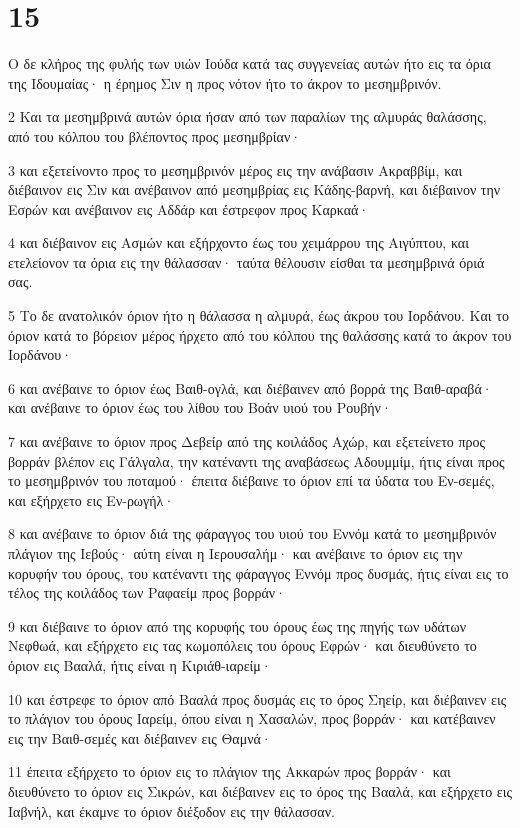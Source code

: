 \chapter{15}

\par Ο δε κλήρος της φυλής των υιών Ιούδα κατά τας συγγενείας αυτών ήτο εις τα όρια της Ιδουμαίας· η έρημος Σιν η προς νότον ήτο το άκρον το μεσημβρινόν.
\par 2 Και τα μεσημβρινά αυτών όρια ήσαν από των παραλίων της αλμυράς θαλάσσης, από του κόλπου του βλέποντος προς μεσημβρίαν·
\par 3 και εξετείνοντο προς το μεσημβρινόν μέρος εις την ανάβασιν Ακραββίμ, και διέβαινον εις Σιν και ανέβαινον από μεσημβρίας εις Κάδης-βαρνή, και διέβαινον την Εσρών και ανέβαινον εις Αδδάρ και έστρεφον προς Καρκαά·
\par 4 και διέβαινον εις Ασμών και εξήρχοντο έως του χειμάρρου της Αιγύπτου, και ετελείονον τα όρια εις την θάλασσαν· ταύτα θέλουσιν είσθαι τα μεσημβρινά όριά σας.
\par 5 Το δε ανατολικόν όριον ήτο η θάλασσα η αλμυρά, έως άκρου του Ιορδάνου. Και το όριον κατά το βόρειον μέρος ήρχετο από του κόλπου της θαλάσσης κατά το άκρον του Ιορδάνου·
\par 6 και ανέβαινε το όριον έως Βαιθ-ογλά, και διέβαινεν από βορρά της Βαιθ-αραβά· και ανέβαινε το όριον έως του λίθου του Βοάν υιού του Ρουβήν·
\par 7 και ανέβαινε το όριον προς Δεβείρ από της κοιλάδος Αχώρ, και εξετείνετο προς βορράν βλέπον εις Γάλγαλα, την κατέναντι της αναβάσεως Αδουμμίμ, ήτις είναι προς το μεσημβρινόν του ποταμού· έπειτα διέβαινε το όριον επί τα ύδατα του Εν-σεμές, και εξήρχετο εις Εν-ρωγήλ·
\par 8 και ανέβαινε το όριον διά της φάραγγος του υιού του Εννόμ κατά το μεσημβρινόν πλάγιον της Ιεβούς· αύτη είναι η Ιερουσαλήμ· και ανέβαινε το όριον εις την κορυφήν του όρους, του κατέναντι της φάραγγος Εννόμ προς δυσμάς, ήτις είναι εις το τέλος της κοιλάδος των Ραφαείμ προς βορράν·
\par 9 και διέβαινε το όριον από της κορυφής του όρους έως της πηγής των υδάτων Νεφθωά, και εξήρχετο εις τας κωμοπόλεις του όρους Εφρών· και διευθύνετο το όριον εις Βααλά, ήτις είναι η Κιριάθ-ιαρείμ·
\par 10 και έστρεφε το όριον από Βααλά προς δυσμάς εις το όρος Σηείρ, και διέβαινεν εις το πλάγιον του όρους Ιαρείμ, όπου είναι η Χασαλών, προς βορράν· και κατέβαινεν εις την Βαιθ-σεμές και διέβαινεν εις Θαμνά·
\par 11 έπειτα εξήρχετο το όριον εις το πλάγιον της Ακκαρών προς βορράν· και διευθύνετο το όριον εις Σικρών, και διέβαινεν εις το όρος της Βααλά, και εξήρχετο εις Ιαβνήλ, και έκαμνε το όριον διέξοδον εις την θάλασσαν.
